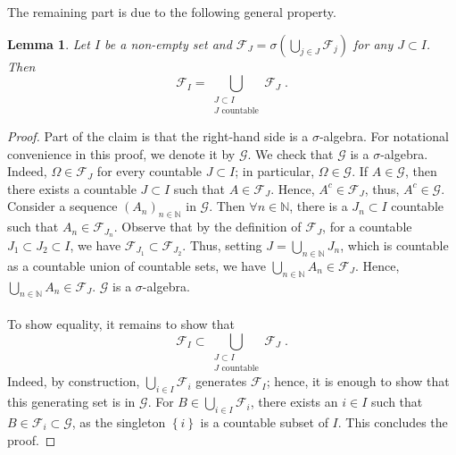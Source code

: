 \documentclass[11pt]{report}
\theoremstyle{plain} %
\newtheorem{lemma}[lemma]{Lemma}
\theoremstyle{definition} %
\theoremstyle{remark} %
\begin{document}
The remaining part is due to the following general property.
 \begin{lemma}\label{lemma:reduction to countable measurability}
     Let \(I\) be a non-empty set and \(\mathcal{F}_J=\sigma(\bigcup_{j\in J}\mathcal{F}_j)\) for any \(J\subset I\). Then 
     \begin{equation}
         \mathcal{F}_I=\bigcup_{\substack{J\subset I\\ J\text{ countable}}}\mathcal{F}_J\;.
     \end{equation}
 \end{lemma}
\begin{proof}
 Part of the claim is that the right-hand side is a \(\sigma\)-algebra. For notational convenience in this proof, we denote it by \(\mathcal{G}\). We check that \(\mathcal{G}\) is a \(\sigma\)-algebra.
 Indeed, \(\Omega\in \mathcal{F}_J\) for every countable \(J\subset I\); in particular, \(\Omega\in \mathcal{G}\). If \(A\in\mathcal{G}\), then there exists a countable \(J\subset I\) such that \(A\in\mathcal{F}_J\). Hence, \(A^c\in\mathcal{F}_J\), thus, \(A^c\in\mathcal{G}\). Consider a sequence \((A_n)_{n\in\mathbb{N}}\) in \(\mathcal{G}\). 
 Then \(\forall n\in\mathbb{N}\), there is a \(J_n\subset I\) countable such that \(A_n\in \mathcal{F}_{J_n}\). Observe that by the definition of \(\mathcal{F}_J\), for a countable \(J_1\subset J_2\subset I\), we have \(\mathcal{F}_{J_1}\subset\mathcal{F}_{J_2}\). Thus, setting \(J=\bigcup_{n\in\mathbb{N}}J_n\), which is countable as a countable union of countable sets, we have \(\bigcup_{n\in\mathbb{N}}A_n\in\mathcal{F}_J\). Hence, \(\bigcup_{n\in\mathbb{N}}A_n\in\mathcal{F}_{J}\). \(\mathcal{G}\) is a \(\sigma\)-algebra. 
 \\\\
 To show equality, it remains to show that 
 \begin{equation}
     \mathcal{F}_I\subset \bigcup_{\substack{J\subset I\\ J\text{ countable}}}\mathcal{F}_J\;.
 \end{equation}
Indeed, by construction, \(\bigcup_{i\in I}\mathcal{F}_i\) generates \(\mathcal{F}_I\); hence, it is enough to show that this generating set is in \(\mathcal{G}\). For \(B\in\bigcup_{i\in I}\mathcal{F}_i\), there exists an \(i\in I\) such that \(B\in \mathcal{F}_i\subset\mathcal{G}\), as the singleton \(\left\{i\right\}\) is a countable subset of \(I\). This concludes the proof. 
\end{proof}
 
\end{document}
